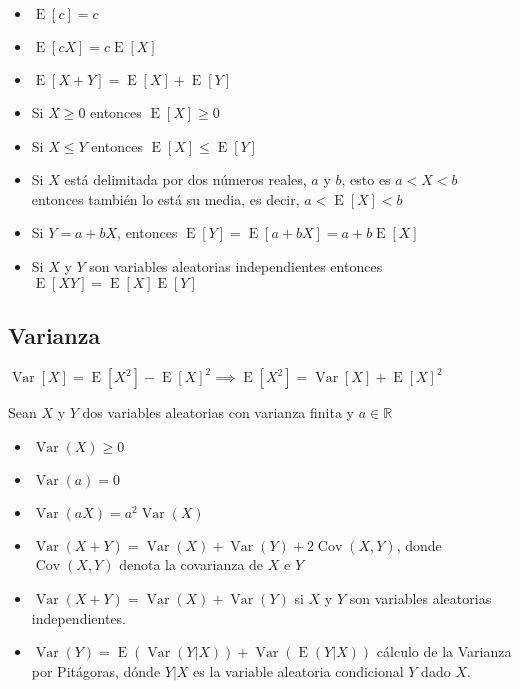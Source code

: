 \documentclass[
]{article}
\providecommand{\tightlist}{%
  \setlength{\itemsep}{0pt}\setlength{\parskip}{0pt}}
\begin{document}
\begin{itemize}
\tightlist
\item
  \({\operatorname {E} [c]=c}\)
\item
  \({\operatorname {E} [cX]=c\operatorname {E} [X]}\)
\item
  \({\operatorname {E} [X+Y]=\operatorname {E} [X]+\operatorname {E} [Y]}\)
\item
  Si \({X\geq 0}\) entonces \({\operatorname {E} [X]\geq 0}\)
\item
  Si \({X\leq Y}\) entonces
  \({\operatorname {E} [X]\leq \operatorname {E} [Y]}\)
\item
  Si \(X\) está delimitada por dos números reales, \(a\) y \(b\), esto
  es \({a<X<b}\) entonces también lo está su media, es decir,
  \({a<\operatorname {E} [X]<b}\)
\item
  Si \({Y=a+bX}\), entonces
  \({\operatorname {E} [Y]=\operatorname {E} [a+bX]=a+b\operatorname {E} [X]}\)
\item
  Si \(X\) y \(Y\) son variables aleatorias independientes entonces
  \({\operatorname {E} [XY]=\operatorname {E} [X]\operatorname {E} [Y]}\)
\end{itemize}

\hypertarget{varianza}{%
\subsection{Varianza}\label{varianza}}

\(\operatorname {Var}[X]=\operatorname {E} [X^{2}]-\operatorname {E} [X]^{2} \implies \operatorname {E} [X^{2}] = \operatorname {Var}[X] + \operatorname {E} [X]^{2}\)

Sean \(X\) y \(Y\) dos variables aleatorias con varianza finita y
\({a\in \mathbb {R} }\)

\begin{itemize}
\tightlist
\item
  \({\operatorname {Var} (X)\geq 0}\)
\item
  \({\operatorname {Var} (a)=0}\)
\item
  \({\operatorname {Var} (aX)=a^{2}\operatorname {Var} (X)}\)
\item
  \({\operatorname {Var} (X+Y)=\operatorname {Var} (X)+\operatorname {Var} (Y)+2\operatorname {Cov} (X,Y)}\),
  donde \({\operatorname {Cov} (X,Y)}\) denota la covarianza de \(X\) e
  \(Y\)
\item
  \({\operatorname {Var} (X+Y)=\operatorname {Var} (X)+\operatorname {Var} (Y)}\)
  si \(X\) y \(Y\) son variables aleatorias independientes.
\item
  \({\operatorname {Var} (Y)=\operatorname {E} (\operatorname {Var} (Y|X))+\operatorname {Var} (\operatorname {E} (Y|X))}\)
  cálculo de la Varianza por Pitágoras, dónde \({Y|X}\) es la variable
  aleatoria condicional \(Y\) dado \(X\).
\end{itemize}
\end{document}
